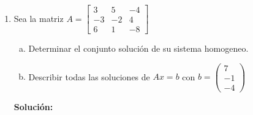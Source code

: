 \documentclass[12pt]{article}
\newenvironment{solucion}
{\begin{mdframed}[backgroundcolor=black!10]
		{\bf Solución:}\\
	}
	{
	\end{mdframed}
}
\newenvironment{preguntas}
{\begin{enumerate}\itemsep12pt
	}
	{
	\end{enumerate}
}
\begin{document}
\begin{preguntas}
\begin{solucion}
$$\begin{pmatrix}
		- 1\\
		0
		\end{pmatrix} + x_3 \begin{pmatrix}
		1\\
		1\\
		1
		\end{pmatrix}$$
		Por último, la solución es
		$$S = \begin{pmatrix}
		7\\
		- 1\\
		0
		\end{pmatrix} + Gen\left\{\begin{pmatrix}
		1\\
		1\\
		1
		\end{pmatrix}\right\}$$
		Notemos que la solución del sistema homogeneo será lo mismo pero quitando el vector que no forma parte del generado, es decir
		$$S_H = Gen\left\{\begin{pmatrix}
		1\\
		1\\
		1
		\end{pmatrix}\right\}$$
\end{solucion}
\item Sea la matriz $A=
	\begin{bmatrix}
	3 & 5 & -4\\
	-3 & -2 & 4\\
	6 & 1 & -8
	\end{bmatrix}$
\begin{enumerate}[a)]
\item Determinar el conjunto solución de su sistema homogeneo.
\item Describir todas las soluciones de $Ax=b$ con $b=
		\begin{pmatrix}
		7\\
		-1\\
		-4
		\end{pmatrix}$ 
\end{enumerate}
\begin{solucion}


\end{solucion}
\end{preguntas}
\end{document}
